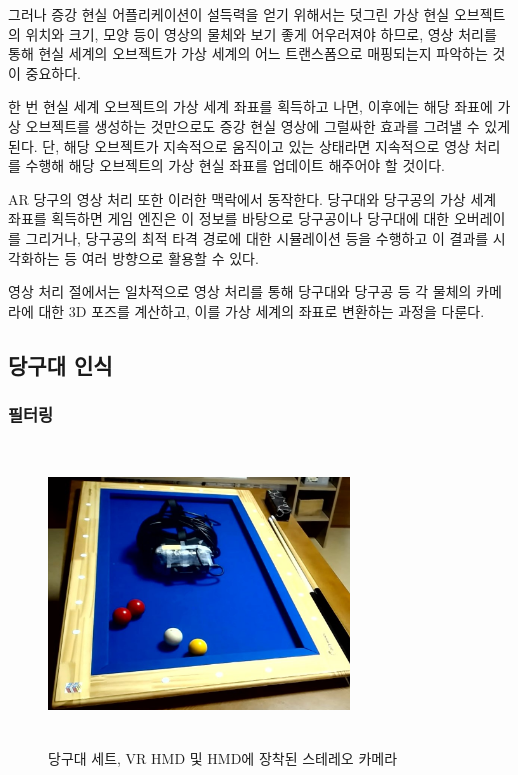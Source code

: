 \documentclass[10pt]{oblivoir}
\begin{document}
그러나 증강 현실 어플리케이션이 설득력을 얻기 위해서는 덧그린 가상 현실 오브젝트의 위치와 크기, 모양 등이 영상의 물체와 보기 좋게 어우러져야 하므로, 영상 처리를 통해 현실 세계의 오브젝트가 가상 세계의 어느 트랜스폼으로 매핑되는지 파악하는 것이 중요하다.

한 번 현실 세계 오브젝트의 가상 세계 좌표를 획득하고 나면, 이후에는 해당 좌표에 가상 오브젝트를 생성하는 것만으로도 증강 현실 영상에 그럴싸한 효과를 그려낼 수 있게 된다. 단, 해당 오브젝트가 지속적으로 움직이고 있는 상태라면 지속적으로 영상 처리를 수행해 해당 오브젝트의 가상 현실 좌표를 업데이트 해주어야 할 것이다.

AR 당구의 영상 처리 또한 이러한 맥락에서 동작한다. 당구대와 당구공의 가상 세계 좌표를 획득하면 게임 엔진은 이 정보를 바탕으로 당구공이나 당구대에 대한 오버레이를 그리거나, 당구공의 최적 타격 경로에 대한 시뮬레이션 등을 수행하고 이 결과를 시각화하는 등 여러 방향으로 활용할 수 있다.

영상 처리 절에서는 일차적으로 영상 처리를 통해 당구대와 당구공 등 각 물체의 카메라에 대한 3D 포즈를 계산하고, 이를 가상 세계의 좌표로 변환하는 과정을 다룬다.

\subsection{당구대 인식}
\subsubsection{필터링}
\label{section;imgproc;table}
\begin{figure}[ht]
    \centering
    \includegraphics[width=8cm, height=8cm, keepaspectratio]{img/billiards-table.png}
    \caption[Caption for LOF]{당구대 세트, VR HMD 및 HMD에 장착된 스테레오 카메라\footnotemark}
    \label{fig;pool-table}
\end{figure}
\end{document}
